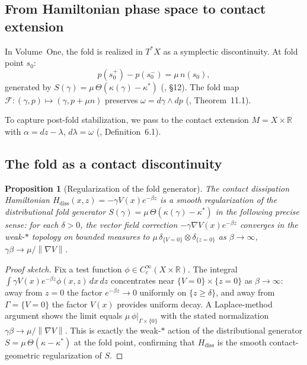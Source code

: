 \documentclass[12pt, oneside]{book}
\theoremstyle{plain}
\newtheorem{proposition}[theorem]{Proposition}
\theoremstyle{definition}
\theoremstyle{remark}
\newcommand{\R}{\mathbb{R}}
\newcommand{\Orb}{\Gamma}
\newcommand{\norm}[1]{\left\|#1\right\|}
\begin{document}
\subsection{From Hamiltonian phase space to contact extension}

In Volume~One, the fold is realized in $T^*X$ as a symplectic
discontinuity. At fold point $s_0$:
\[
  p(s_0^+) - p(s_0^-) = \mu\,n(s_0),
\]
generated by $S(\gamma) = \mu\,\Theta(\kappa(\gamma)-\kappa^*)$
(\cite{PO1}, \S12). The fold map
$\mathcal{F}:(\gamma,p)\mapsto(\gamma,p+\mu n)$
preserves $\omega = d\gamma\wedge dp$
(\cite{PO1}, Theorem~11.1).

To capture post-fold stabilization, we pass to the contact
extension $M = X\times\R$ with $\alpha = dz - \lambda$,
$d\lambda=\omega$ (\cite{Paper1}, Definition~6.1).

\subsection{The fold as a contact discontinuity}

\begin{proposition}[Regularization of the fold generator]
\label{prop:regularization}
The contact dissipation Hamiltonian
$H_{\mathrm{diss}}(x,z) = -\gamma V(x)e^{-\beta z}$
is a smooth regularization of the distributional fold generator
$S(\gamma) = \mu\,\Theta(\kappa(\gamma)-\kappa^*)$
in the following precise sense: for each $\delta>0$, the
vector field correction $-\gamma\nabla V(x)e^{-\beta z}$
converges in the weak-$*$ topology on bounded measures to
$\mu\,\delta_{\{V=0\}}\otimes\delta_{\{z=0\}}$ as
$\beta\to\infty$, $\gamma\beta\to\mu/\norm{\nabla V}$.
\end{proposition}

\begin{proof}[Proof sketch]
Fix a test function $\phi\in C_c^\infty(X\times\R)$.
The integral $\int \gamma V(x)e^{-\beta z}\phi(x,z)\,dx\,dz$
concentrates near $\{V=0\}\times\{z=0\}$ as $\beta\to\infty$:
away from $z=0$ the factor $e^{-\beta z}\to 0$ uniformly on
$\{z\ge\delta\}$, and away from $\Orb=\{V=0\}$ the factor
$V(x)$ provides uniform decay. A Laplace-method argument shows
the limit equals $\mu\,\phi|_{\Orb\times\{0\}}$ with the
stated normalization $\gamma\beta\to\mu/\norm{\nabla V}$.
This is exactly the weak-$*$ action of the distributional
generator $S = \mu\,\Theta(\kappa-\kappa^*)$ at the fold
point, confirming that $H_{\mathrm{diss}}$ is the smooth
contact-geometric regularization of $S$.
\end{proof}
\end{document}

